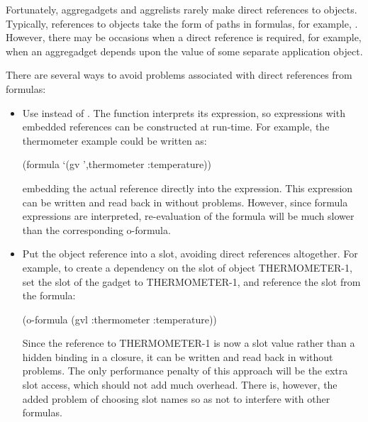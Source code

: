 Fortunately,
aggregadgets and aggrelists rarely make direct references to objects.
Typically, references to objects take the form of paths in formulas,
for example, .  However, there may be
occasions when a direct reference is required, for example, when an
aggregadget depends upon the value of some separate application object.

There are several ways to avoid problems associated with direct references
from formulas:
\begin{itemize}
\item Use  instead of .  The  function
interprets its expression, so expressions with embedded references
can be constructed at run-time.  For example, the thermometer example
could be written as:
\begin{programexample}
(formula `(gv ',thermometer :temperature))
\end{programexample}
embedding the actual reference directly into the expression.  This
expression can be written and read back in without problems.
However, since formula expressions are interpreted, re-evaluation of the
formula will be much slower than the corresponding o-formula.

\item Put the object reference into a slot, avoiding direct references altogether.
For example, to create a dependency on the  slot of object
THERMOMETER-1, set the  slot of the gadget to
THERMOMETER-1, and reference the slot from the formula:
\begin{programexample}
(o-formula (gvl :thermometer :temperature))
\end{programexample}
Since the reference to THERMOMETER-1 is now a slot value rather
than a hidden binding in a closure, it can be written and read back in
without problems.  The only performance penalty of this approach
will be the extra slot access, which should not add much overhead.
There is, however, the added problem of choosing slot names so as not
to interfere with other formulas.
\end{itemize}



